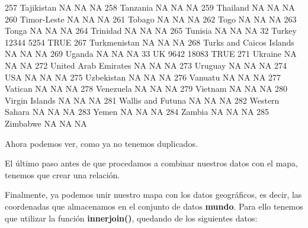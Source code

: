 \documentclass [a4paper] {article}
\begin{document}
\begin{Schunk}
\begin{Soutput}
257                          Tajikistan    NA    NA   NA
258                            Tanzania    NA    NA   NA
259                            Thailand    NA    NA   NA
260                         Timor-Leste    NA    NA   NA
261                              Tobago    NA    NA   NA
262                                Togo    NA    NA   NA
263                               Tonga    NA    NA   NA
264                            Trinidad    NA    NA   NA
265                             Tunisia    NA    NA   NA
32                               Turkey 12344  5254 TRUE
267                        Turkmenistan    NA    NA   NA
268            Turks and Caicos Islands    NA    NA   NA
269                              Uganda    NA    NA   NA
33                                   UK  9642 18083 TRUE
271                             Ukraine    NA    NA   NA
272                United Arab Emirates    NA    NA   NA
273                             Uruguay    NA    NA   NA
274                                 USA    NA    NA   NA
275                          Uzbekistan    NA    NA   NA
276                             Vanuatu    NA    NA   NA
277                             Vatican    NA    NA   NA
278                           Venezuela    NA    NA   NA
279                             Vietnam    NA    NA   NA
280                      Virgin Islands    NA    NA   NA
281                   Wallis and Futuna    NA    NA   NA
282                      Western Sahara    NA    NA   NA
283                               Yemen    NA    NA   NA
284                              Zambia    NA    NA   NA
285                            Zimbabwe    NA    NA   NA
\end{Soutput}
\end{Schunk}

Ahora podemos ver, como ya no tenemos duplicados.

El último paso antes de que procedamos a combinar nuestros datos con el mapa, tenemos que
crear una relación.

\begin{Schunk}
\end{Schunk}

Finalmente, ya podemos unir nuestro mapa con los datos geográficos, es decir, las coordenadas que 
almacenamos en el conjunto de datos \textbf{mundo}. Para ello tenemos que utilizar la función
\textbf{innerjoin()}, quedando de los siguientes datos:
\end{document}
